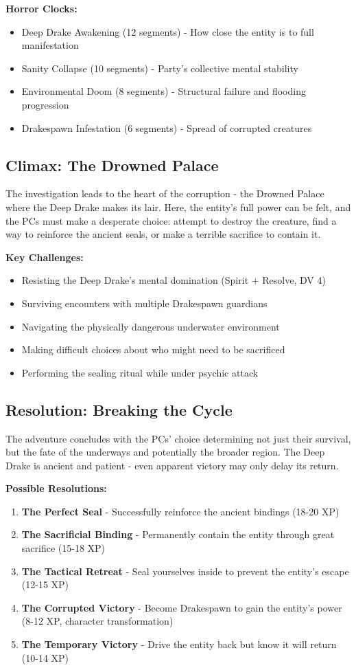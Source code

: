 \documentclass[11pt]{article}
\begin{document}
\textbf{Horror Clocks:}
\begin{itemize}
\item Deep Drake Awakening (12 segments) - How close the entity is to full manifestation
\item Sanity Collapse (10 segments) - Party's collective mental stability
\item Environmental Doom (8 segments) - Structural failure and flooding progression
\item Drakespawn Infestation (6 segments) - Spread of corrupted creatures
\end{itemize}

\subsection{Climax: The Drowned Palace}

The investigation leads to the heart of the corruption - the Drowned Palace where the Deep Drake makes its lair. Here, the entity's full power can be felt, and the PCs must make a desperate choice: attempt to destroy the creature, find a way to reinforce the ancient seals, or make a terrible sacrifice to contain it.

\textbf{Key Challenges:}
\begin{itemize}
\item Resisting the Deep Drake's mental domination (Spirit + Resolve, DV 4)
\item Surviving encounters with multiple Drakespawn guardians
\item Navigating the physically dangerous underwater environment
\item Making difficult choices about who might need to be sacrificed
\item Performing the sealing ritual while under psychic attack
\end{itemize}

\subsection{Resolution: Breaking the Cycle}

The adventure concludes with the PCs' choice determining not just their survival, but the fate of the underways and potentially the broader region. The Deep Drake is ancient and patient - even apparent victory may only delay its return.

\textbf{Possible Resolutions:}
\begin{enumerate}
\item \textbf{The Perfect Seal} - Successfully reinforce the ancient bindings (18-20 XP)
\item \textbf{The Sacrificial Binding} - Permanently contain the entity through great sacrifice (15-18 XP)
\item \textbf{The Tactical Retreat} - Seal yourselves inside to prevent the entity's escape (12-15 XP)
\item \textbf{The Corrupted Victory} - Become Drakespawn to gain the entity's power (8-12 XP, character transformation)
\item \textbf{The Temporary Victory} - Drive the entity back but know it will return (10-14 XP)
\end{enumerate}
\end{document}
